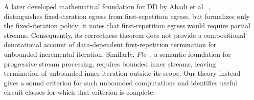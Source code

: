 A later developed mathematical foundation for DD by Abadi et al.~\cite{Abadi2015FoundationsOD}, distinguishes fixed-iteration egress from first-repetition egress, but formalizes only the fixed-iteration policy; it notes that first-repetition egress would require partial streams. Consequently, its correctness theorem does not provide a compositional denotational account of data-dependent first-repetition termination for unbounded incremental iteration. Similarly, \textit{Flo}~\cite{Laddad2024FloAS}, a semantic foundation for progressive stream processing, requires bounded inner streams, leaving termination of unbounded inner iteration outside its scope. Our theory instead gives a sound criterion for such unbounded computations and identifies useful circuit classes for which that criterion is complete.
